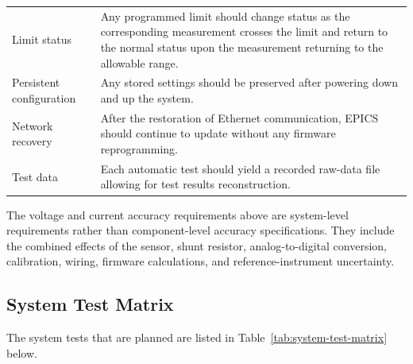 \begin{longtable}{p{} p{}}
	Limit status &
	Any programmed limit should change status as the corresponding measurement
	crosses the limit and return to the normal status upon the measurement
	returning to the allowable range. \\
	
	Persistent configuration &
	Any stored settings should be preserved after powering down and up the
	system. \\
	
	Network recovery &
	After the restoration of Ethernet communication, EPICS should continue to
	update without any firmware reprogramming. \\
	
	Test data &
	Each automatic test should yield a recorded raw-data file allowing for
	test results reconstruction. \\
	
	\bottomrule
\end{longtable}

The voltage and current accuracy requirements above are system-level requirements
rather than component-level accuracy specifications. They include the combined effects
of the sensor, shunt resistor, analog-to-digital conversion, calibration, wiring,
firmware calculations, and reference-instrument uncertainty.
\newpage
\subsection{System Test Matrix}

The system tests that are planned are listed in Table~\ref{tab:system-test-matrix} below.

